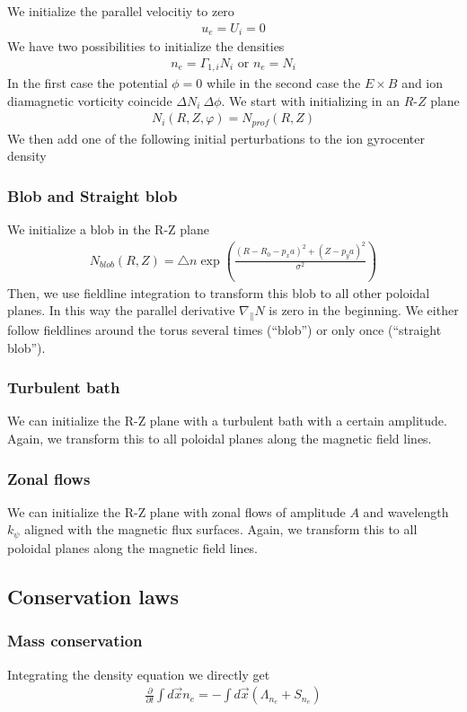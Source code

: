 We initialize the parallel velocitiy to zero
\begin{align}
  u_e = U_i = 0
  \label{}
\end{align}
We have two possibilities to initialize the densities
\begin{align}
  n_e = \Gamma_{1,i} N_i \text{ or } n_e = N_i
  \label{}
\end{align}
In the first case the potential $\phi= 0$ while in the second case
the $E\times B$ and ion diamagnetic vorticity coincide $\Delta N_i ~ \Delta \phi$.
We start with initializing in an $R$-$Z$ plane
\begin{align}
  N_i(R,Z,\varphi)= N_{prof}(R,Z)
  \label{}
\end{align}
We then add one of the following initial perturbations to the ion gyrocenter density
\subsubsection{Blob and Straight blob}
We initialize a blob in the R-Z plane
\begin{align}
  N_{blob}(R,Z) = \triangle n \exp\left( \frac{(R - R_0 - p_x a)^2 + (Z-p_ya)^2}{\sigma^2} \right)
  \label{}
\end{align}
Then, we use fieldline integration to transform this blob to all other poloidal planes. In this way the parallel derivative $\nabla_\parallel N$ is zero in the beginning.
We either follow fieldlines around the torus several times (``blob'') or only once
(``straight blob'').
\subsubsection{Turbulent bath}
We can initialize the R-Z plane with a turbulent bath with a certain amplitude.
Again, we transform this to all poloidal planes along the magnetic field lines.
\subsubsection{Zonal flows}
We can initialize the R-Z plane with zonal flows of amplitude $A$ and wavelength $k_\psi$ aligned with the magnetic flux surfaces.
Again, we transform this to all poloidal planes along the magnetic field lines.

\subsection{Conservation laws} \label{sec:conservation}
\subsubsection{Mass conservation}
Integrating the density equation we directly get
\begin{align}
  \frac{\partial}{\partial t} \int d\vec{x} n_e =  - \int d\vec{x} (\Lambda_{n_e}+S_{n_e})
\end{align}
